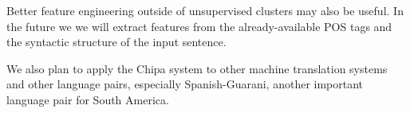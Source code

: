 \documentclass[10pt, a4paper]{article}
\begin{document}
Better feature engineering outside of unsupervised clusters may also be useful.
In the future we we will extract features from the already-available POS tags
and the syntactic structure of the input sentence.

We also plan to apply the Chipa system to other machine translation systems and
other language pairs, especially Spanish-Guarani, another important language
pair for South America.



\end{document}
